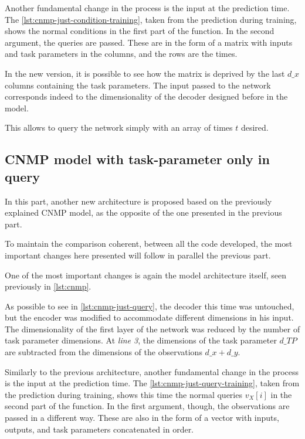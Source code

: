 Another fundamental change in the process is the input at the prediction time. The \cref{lst:cnmp-just-condition-training}, taken from the prediction during training, shows the normal conditions in the first part of the function. In the second argument, the queries are passed. These are in the form of a matrix with inputs and task parameters in the columns, and the rows are the times.

In the new version, it is possible to see how the matrix is deprived by the last $d\_x$ columns containing the task parameters. The input passed to the network corresponds indeed to the dimensionality of the decoder designed before in the model.

This allows to query the network simply with an array of times $t$ desired. 



\subsection{CNMP model with task-parameter only in query}
In this part, another new architecture is proposed based on the previously explained CNMP model, as the opposite of the one presented in the previous part.

To maintain the comparison coherent, between all the code developed, the most important changes here presented will follow in parallel the previous part. 

One of the most important changes is again the model architecture itself, seen previously in \cref{lst:cnmp}.  



As possible to see in \cref{lst:cnmp-just-query}, the decoder this time was untouched, but the encoder was modified to accommodate different dimensions in his input. The dimensionality of the first layer of the network was reduced by the number of task parameter dimensions. At \emph{line 3}, the dimensions of the task parameter $d\_TP$ are subtracted from the dimensions of the observations $d\_x+d\_y$.



Similarly to the previous architecture, another fundamental change in the process is the input at the prediction time. The \cref{lst:cnmp-just-query-training}, taken from the prediction during training, shows this time the normal queries $v_X [ i ]$ in the second part of the function. In the first argument, though, the observations are passed in a different way. These are also in the form of a vector with inputs, outputs, and task parameters concatenated in order. 

